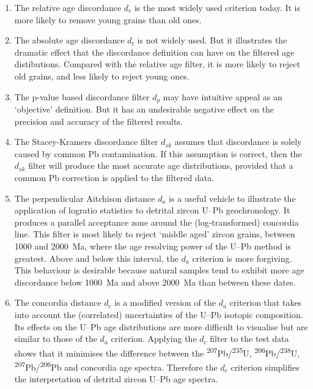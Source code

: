 \documentclass[gchron, manuscript]{copernicus}
\begin{document}
\begin{enumerate}
  \item The relative age discordance $d_r$ is the most widely used
    criterion today. It is more likely to remove young grains than old
    ones.
  \item The absolute age discordance $d_t$ is not widely used. But it
    illustrates the dramatic effect that the discordance definition
    can have on the filtered age distibutions. Compared with the
    relative age filter, it is more likely to reject old grains, and
    less likely to reject young ones.
  \item The p-value based discordance filter $d_p$ may have intuitive
    appeal as an `objective' definition. But it has an undesirable
    negative effect on the precision and accuracy of the filtered
    results.
  \item The Stacey-Kramers discordance filter $d_{sk}$ assumes that
    discordance is solely caused by common Pb contamination. If this
    assumption is correct, then the $d_{sk}$ filter will produce the
    most accurate age distributions, provided that a
    \citet{stacey1975} common Pb correction is applied to the filtered
    data.
  \item The perpendicular Aitchison distance $d_a$ is a useful vehicle
    to illustrate the application of logratio statistics to detrital
    zircon U--Pb geochronology. It produces a parallel acceptance zone
    around the (log-transformed) concordia line. This filter is most
    likely to reject `middle aged' zircon grains, between 1000 and
    2000~Ma, where the age resolving power of the U--Pb method is
    greatest. Above and below this interval, the $d_a$ criterion is
    more forgiving. This behaviour is desirable because natural
    samples tend to exhibit more age discordance below 1000~Ma and
    above 2000~Ma than between these dates.
  \item The concordia distance $d_c$ is a modified version of the
    $d_a$ criterion that takes into account the (correlated)
    uncertainties of the U--Pb isotopic composition.  Its effects on
    the U--Pb age distributions are more difficult to visualise but
    are similar to those of the $d_a$ criterion.  Applying the $d_c$
    filter to the test data shows that it minimises the difference
    between the \textsuperscript{207}Pb/\textsuperscript{235}U,
    \textsuperscript{206}Pb/\textsuperscript{238}U,
    \textsuperscript{207}Pb/\textsuperscript{206}Pb and concordia age
    spectra. Therefore the $d_c$ criterion simplifies the
    interpretation of detrital zircon U--Pb age spectra.
\end{enumerate}
\end{document}

